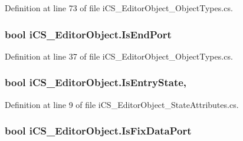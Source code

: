 Definition at line 73 of file i\+C\+S\+\_\+\+Editor\+Object\+\_\+\+Object\+Types.\+cs.

\hypertarget{classi_c_s___editor_object_aad32de8c3424638b072174fb2d9fd095}{
\subsubsection[{Is\+End\+Port}]{\setlength{\rightskip}{0pt plus 5cm}bool i\+C\+S\+\_\+\+Editor\+Object.\+Is\+End\+Port\hspace{0.3cm}{\ttfamily [get]}}}\label{classi_c_s___editor_object_aad32de8c3424638b072174fb2d9fd095}


Definition at line 37 of file i\+C\+S\+\_\+\+Editor\+Object\+\_\+\+Object\+Types.\+cs.

\hypertarget{classi_c_s___editor_object_acb547c555078d6a464a4cf02f40c216a}{
\subsubsection[{Is\+Entry\+State}]{\setlength{\rightskip}{0pt plus 5cm}bool i\+C\+S\+\_\+\+Editor\+Object.\+Is\+Entry\+State\hspace{0.3cm}{\ttfamily [get]}, {\ttfamily [set]}}}\label{classi_c_s___editor_object_acb547c555078d6a464a4cf02f40c216a}


Definition at line 9 of file i\+C\+S\+\_\+\+Editor\+Object\+\_\+\+State\+Attributes.\+cs.

\hypertarget{classi_c_s___editor_object_a09e22b9d4d2613d242b9944b7b7c244b}{
\subsubsection[{Is\+Fix\+Data\+Port}]{\setlength{\rightskip}{0pt plus 5cm}bool i\+C\+S\+\_\+\+Editor\+Object.\+Is\+Fix\+Data\+Port\hspace{0.3cm}{\ttfamily [get]}}}\label{classi_c_s___editor_object_a09e22b9d4d2613d242b9944b7b7c244b}


